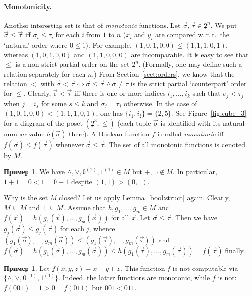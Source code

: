 \documentclass[12pt,notitlepage]{article}
\theoremstyle{plain}
\theoremstyle{definition}
\newtheorem{exm}[thm]{Пример}
\theoremstyle{plain}
\newcommand{\sbs}{\subseteq}
\newcommand{\ul}[1]{\underline{#1}}
\newcommand{\1}{\mathbf{1}}
\newcommand{\0}{\mathbf{0}}
\begin{document}
\paragraph{Monotonicity.}
Another interesting set is that of \emph{monotonic} functions. Let $\vec \sigma, \vec \tau \in \ul{2}^n$. We put $\vec \sigma  \leq \vec \tau$ iff $\sigma_i \leq \tau_i$ for each $i$ from $1$ to $n$ ($x_i$ and $y_i$ are compared w.\,r.\,t.\ the `natural' order where $0 \leq 1$). For example, $(1,0,1,0,0) \leq (1,1,1,0,1)$, whereas $(1,0,1,0,0)$ and $(1,1,0,0,0)$ are incomparable. It is easy to see that ${\leq}$ is a non-strict partial order on the set $\ul{2}^n$. (Formally, one may define such a relation separately for each $n$.) From Section~\ref{sect:orders}, we know that the relation $<$ with $\vec \sigma < \vec \tau \iff \vec \sigma \leq \vec \tau \wedge \sigma \neq \tau$ is the strict partial `counterpart' order for ${\leq}$. Clearly, $\vec \sigma < \vec \tau$ iff there is one or more indices $i_1, \ldots, i_k$ such that $\sigma_j < \tau_j$ when $j = i_s$ for some $s \leq k$ and $\sigma_j = \tau_j$ otherwise. In the case of $(1,0,1,0,0) < (1,1,1,0,1)$, one has $\{i_1, i_2\} = \{2, 5\}$. See Figure~\ref{fig:cube_3} for a diagram of the poset $(\ul{2}^3, {\leq})$ (each tuple $\vec \sigma$ is identified with its natural number value $b(\vec\sigma)$ there). A Boolean function $f$ is called \emph{monotonic} iff $f(\vec \sigma) \leq f(\vec \tau)$ whenever $\vec \sigma \leq \vec \tau$. The set of all monotonic functions is denoted by $M$.

\begin{exm}
	We have ${\wedge}, {\vee}, 0^{(1)}, 1^{(1)} \in M$ but ${+}, {\neg} \notin M$. In particular, $1 + 1 = 0 < 1 = 0 + 1$ despite $(1,1) > (0,1)$.
\end{exm}

Why is the set $M$ closed? Let us apply Lemma~\ref{bool:struct} again. Clearly, $M \sbs M$ and $\bot \sbs M$. Assume that $h, g_1, \ldots,g_m \in M$ and $f(\vec x) = h(g_1(\vec x),\ldots, g_m(\vec x))$ for all $\vec x$. Let $\vec \sigma \leq \vec \tau$. Then we have $g_j(\vec \sigma) \leq g_j(\vec \tau)$ for each $j$, whence $(g_1(\vec \sigma),\ldots, g_m(\vec \sigma)) \leq (g_1(\vec \tau),\ldots, g_m(\vec \tau))$ and $f(\vec \sigma) = h(g_1(\vec \sigma),\ldots, g_m(\vec \sigma)) \leq h(g_1(\vec \tau),\ldots, g_m(\vec \tau)) = f(\vec \tau)$ finally.

\begin{exm}
	Let $f(x,y,z) = x + y + z$. This function $f$ is not computable via $\{{\wedge}, {\vee}, 0^{(1)}, 1^{(1)}\}$. Indeed, the latter functions are monotonic, while $f$ is not: $f(001) = 1 > 0 = f(011)$ but $001 < 011$.
\end{exm}
\end{document}
